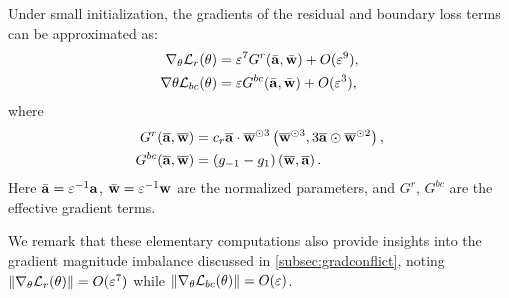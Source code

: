 \begin{lemma} \label{lemma51}
Under small initialization, the gradients of the residual and boundary loss terms can be approximated as:
\begin{align}
\nabla_\theta \mathcal{L}_r(\theta) &= \varepsilon^7 G^r(\bar{\mathbf{a}},\bar{\mathbf{w}}) + O(\varepsilon^9), \\
\nabla\theta \mathcal{L}_{bc}(\theta) &= \varepsilon G^{bc}(\bar{\mathbf{a}},\bar{\mathbf{w}}) + O(\varepsilon^3),
\end{align}
where
\begin{align} \label{eq:effgrad1}
    G^r(\overline{\mathbf{a}},\overline{\mathbf{w}}) &=  c_r  \overline{\mathbf{a}} \cdot \overline{\mathbf{w}}^{\odot 3} \left(  \overline{\mathbf{w}}^{\odot 3},   3  \overline{\mathbf{a}} \odot \overline{\mathbf{w}}^{\odot 2}  \right), \\
  \label{eq:effgrad2}
    G^{bc}(\overline{\mathbf{a}},\overline{\mathbf{w}}) &= (g_{-1} - g_1) \left(\overline{\mathbf{w}}, \overline{\mathbf{a}} \right).
\end{align}
Here $\bar{\mathbf{a}} = \varepsilon^{-1}\mathbf{a}$, $\bar{\mathbf{w}} = \varepsilon^{-1}\mathbf{w}$ are the normalized parameters, and $G^r$, $G^{bc}$ are the effective gradient terms.
\end{lemma}
We remark that these elementary computations also provide insights into the gradient magnitude imbalance discussed in \cref{subsec:gradconflict}, noting $\|\nabla_\theta \mathcal{L}_r(\theta) \| = O(\varepsilon^7)$ while $\| \nabla_{\theta} \mathcal{L}_{bc}(\theta) \| = O(\varepsilon)$. 

